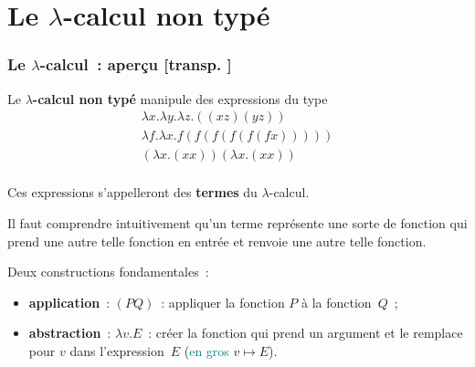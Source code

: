 \documentclass[mathserif,a4paper,aspectratio=169]{beamer}
\renewcommand{\frametitle}[1]{\subsubsection*{#1 {\footnotesize[transp. \insertframenumber]}}}
\begin{document}
\section{Le \texorpdfstring{$\lambda$}{lambda}-calcul non typé}
\begin{frame}
\frametitle{Le $\lambda$-calcul : aperçu}

Le \textbf{$\lambda$-calcul non typé} manipule des expressions du type
\[
\begin{array}{c}
\lambda x.\lambda y.\lambda z.((xz)(yz))\\
\lambda f.\lambda x.f(f(f(f(f(fx)))))\\
(\lambda x.(xx))(\lambda x.(xx))\\
\end{array}
\]

\bigskip

Ces expressions s'appelleront des \textbf{termes} du $\lambda$-calcul.

\bigskip

Il faut comprendre intuitivement qu'un terme représente une sorte de
fonction qui prend une autre telle fonction en entrée et renvoie une
autre telle fonction.

\bigskip

Deux constructions fondamentales :
\begin{itemize}
\item\textbf{application} : $(PQ)$ : appliquer la fonction $P$ à la
  fonction $Q$ ;
\item\textbf{abstraction} : $\lambda v.E$ : créer la fonction qui
  prend un argument et le remplace pour $v$ dans l'expression $E$
  (\textcolor{teal}{en gros} $v \mapsto E$).
\end{itemize}

\end{frame}
%
\end{document}
